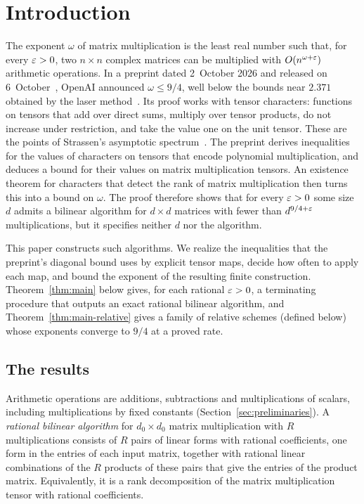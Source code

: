 \section{Introduction}
\label{sec:introduction}

The exponent \(\omega\) of matrix multiplication is the least real number
such that, for every \(\varepsilon>0\), two \(n\times n\) complex matrices can
be multiplied with \(O(n^{\omega+\varepsilon})\) arithmetic operations. In a
preprint dated 2~October 2026 and released on 6~October~\citep{OAI26},
OpenAI announced \(\omega\le9/4\), well below the bounds near \(2.371\)
obtained by the laser method~\citep{AD25,Dup26,Zad26,OAI26Stag}. Its proof works
with tensor characters:
functions on tensors that add over direct sums, multiply over tensor
products, do not increase under restriction, and take the value one on
the unit tensor. These are the points of Strassen's asymptotic
spectrum~\citep{Str88}. The preprint derives inequalities for the values
of characters on tensors that encode polynomial multiplication, and
deduces a bound for their values on matrix multiplication tensors. An
existence theorem for characters that detect the rank of matrix
multiplication then turns this into a bound on \(\omega\). The proof
therefore shows that for every \(\varepsilon>0\) some size \(d\) admits a
bilinear algorithm for \(d\times d\) matrices with fewer than
\(d^{9/4+\varepsilon}\) multiplications, but it specifies neither \(d\) nor the
algorithm.

This paper constructs such algorithms. We realize the inequalities that
the preprint's diagonal bound uses by explicit tensor maps, decide how
often to apply each map, and bound the exponent of the resulting finite
construction. Theorem~\ref{thm:main} below gives, for each rational
\(\varepsilon>0\), a terminating procedure that outputs an exact rational
bilinear algorithm, and Theorem~\ref{thm:main-relative} gives a family
of relative schemes (defined below) whose exponents converge to \(9/4\)
at a proved rate.

\subsection{The results}
\label{subsec:intro-results}

Arithmetic operations are additions, subtractions and multiplications of
scalars, including multiplications by fixed constants
(Section~\ref{sec:preliminaries}). A \emph{rational bilinear algorithm}
for \(d_0\times d_0\) matrix multiplication with \(R\) multiplications
consists of \(R\) pairs of linear forms with rational coefficients, one
form in the entries of each input matrix, together with rational linear
combinations of the \(R\) products of these pairs that give the entries
of the product matrix. Equivalently, it is a rank decomposition of the
matrix multiplication tensor with rational coefficients.

